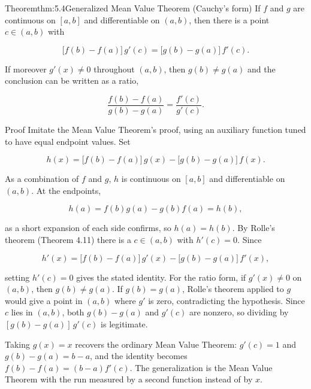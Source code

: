 \documentclass[a4paper,12pt,oneside]{memoir}
\begin{document}
\begin{envtheorem}{Theorem}{thm:5.4}{Generalized Mean Value Theorem (Cauchy’s form)}
If \(f\) and \(g\) are continuous on \([a, b]\) and differentiable on \((a, b)\), then there is a point \(c \in (a, b)\) with

\[ \bigl[f(b) - f(a)\bigr]\,g'(c) = \bigl[g(b) - g(a)\bigr]\,f'(c). \]

If moreover \(g'(x) \ne 0\) throughout \((a, b)\), then \(g(b) \ne g(a)\) and the conclusion can be written as a ratio,

\[ \frac{f(b) - f(a)}{g(b) - g(a)} = \frac{f'(c)}{g'(c)}. \]
\end{envtheorem}
\begin{envproof}{Proof}{}{}
Imitate the Mean Value Theorem’s proof, using an auxiliary function tuned to have equal endpoint values. Set

\[ h(x) = \bigl[f(b) - f(a)\bigr]\,g(x) - \bigl[g(b) - g(a)\bigr]\,f(x). \]

As a combination of \(f\) and \(g\), \(h\) is continuous on \([a, b]\) and differentiable on \((a, b)\). At the endpoints,

\[ h(a) = f(b)g(a) - g(b)f(a) = h(b), \]

as a short expansion of each side confirms, so \(h(a) = h(b)\). By Rolle’s theorem (Theorem 4.11) there is a \(c \in (a, b)\) with \(h'(c) = 0\). Since

\[ h'(x) = \bigl[f(b) - f(a)\bigr]\,g'(x) - \bigl[g(b) - g(a)\bigr]\,f'(x), \]

setting \(h'(c) = 0\) gives the stated identity. For the ratio form, if \(g'(x) \ne 0\) on \((a, b)\), then \(g(b) \ne g(a)\). If \(g(b) = g(a)\), Rolle’s theorem applied to \(g\) would give a point in \((a, b)\) where \(g'\) is zero, contradicting the hypothesis. Since \(c\) lies in \((a, b)\), both \(g(b) - g(a)\) and \(g'(c)\) are nonzero, so dividing by \([g(b) - g(a)]\,g'(c)\) is legitimate. \qedmark
\end{envproof}
\begin{informal}
Taking \(g(x) = x\) recovers the ordinary Mean Value Theorem: \(g'(c) = 1\) and \(g(b) - g(a) = b - a\), and the identity becomes \(f(b) - f(a) = (b - a)f'(c)\). The generalization is the Mean Value Theorem with the run measured by a second function instead of by \(x\).
\end{informal}
\end{document}
